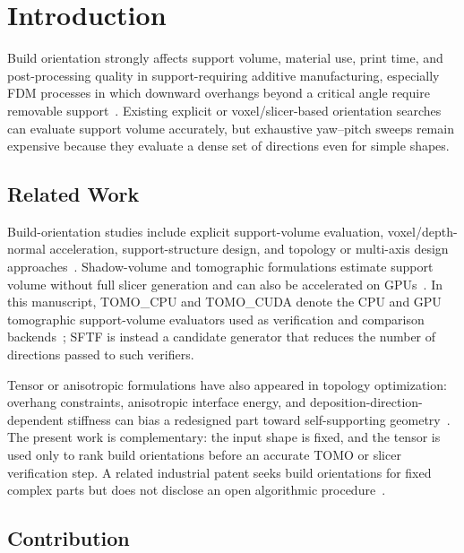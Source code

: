 \documentclass[11pt,a4paper]{article}
\begin{document}
\section{Introduction}

Build orientation strongly affects support volume, material use, print time, and post-processing quality in support-requiring additive manufacturing, especially FDM processes in which downward overhangs beyond a critical angle require removable support~\cite{gibson}. Existing explicit or voxel/slicer-based orientation searches can evaluate support volume accurately, but exhaustive yaw--pitch sweeps remain expensive because they evaluate a dense set of directions even for simple shapes.

\subsection{Related Work}
\label{sec:related}

Build-orientation studies include explicit support-volume evaluation, voxel/depth-normal acceleration, support-structure design, and topology or multi-axis design approaches~\cite{das2017,wang2010,vaissier2019,jiang2018,mirzendehdel2016,langelaar2018,dai2018}. Shadow-volume and tomographic formulations estimate support volume without full slicer generation and can also be accelerated on GPUs~\cite{ezair,msst,gpumsst}. In this manuscript, TOMO\_CPU and TOMO\_CUDA denote the CPU and GPU tomographic support-volume evaluators used as verification and comparison backends~\cite{gpumsst}; SFTF is instead a candidate generator that reduces the number of directions passed to such verifiers.

Tensor or anisotropic formulations have also appeared in topology optimization: overhang constraints, anisotropic interface energy, and deposition-direction-dependent stiffness can bias a redesigned part toward self-supporting geometry~\cite{gaynor2014,garcke2023,shin2025}. The present work is complementary: the input shape is fixed, and the tensor is used only to rank build orientations before an accurate TOMO or slicer verification step. A related industrial patent seeks build orientations for fixed complex parts but does not disclose an open algorithmic procedure~\cite{smith2025patent}.

\subsection{Contribution}
\end{document}
